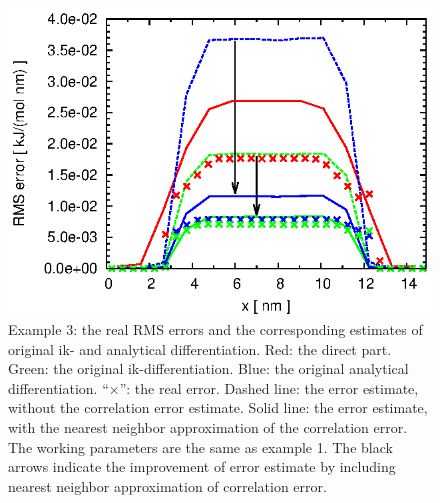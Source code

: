 \documentclass[aps,pre,preprint,unsortedaddress]{revtex4}
\begin{document}
\begin{figure}
  \centering
  \includegraphics[]{fig.new//fig.water.orig.error.eps}
  \caption{
    Example 3: the real RMS errors and the corresponding
    estimates of original ik- and analytical differentiation.
    Red: the direct part.
    Green: the original ik-differentiation.
    Blue: the original analytical differentiation.
    ``$\times$'': the real error.
    Dashed line: the error estimate, without the correlation error estimate.
    Solid  line: the error estimate, with the nearest neighbor
    approximation of the correlation error.
    The working parameters are the same as example 1.
    The black arrows indicate the improvement
    of error estimate by including nearest neighbor
    approximation of correlation error.
  }   
  \label{fig:water-error0}
\end{figure}
\end{document}
